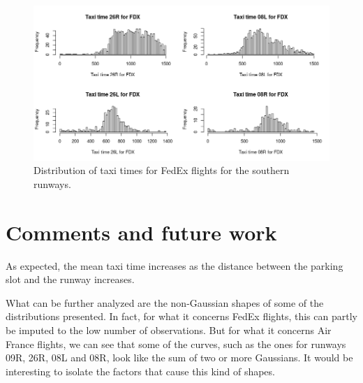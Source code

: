 \documentclass{article}
\begin{document}
\begin{center}
	\begin{figure}[h!!!!!!!!]
		\centering
		\includegraphics[width=\textwidth]{FDX_pistes_sud}
		\caption{Distribution of taxi times for FedEx flights for the southern runways.}
		\label{distSFDX}
	\end{figure}
\end{center}

\section{Comments and future work}
As expected, the mean taxi time increases as the distance between the parking slot and the runway increases.

What can be further analyzed are the non-Gaussian shapes of some of the distributions presented. In fact, for what it concerns FedEx flights, this can partly be imputed to the low number of observations. But for what it concerns Air France flights, we can see that some of the curves, such as the ones for runways 09R, 26R, 08L and 08R, look like the sum of two or more Gaussians. It would be interesting to isolate the factors that cause this kind of shapes.
\end{document}
